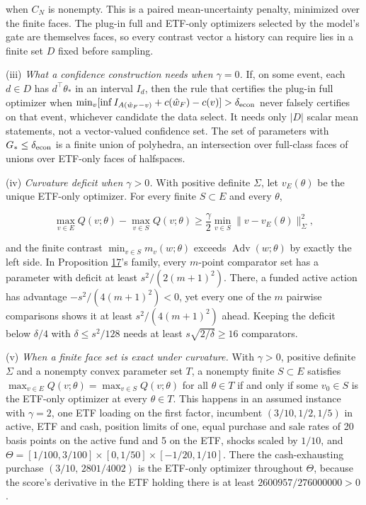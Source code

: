 \documentclass[11pt]{article}
\begin{document}
when \(C_N\) is nonempty. This is a paired mean-uncertainty penalty,
minimized over the finite faces. The plug-in full and ETF-only
optimizers selected by the model's gate are themselves faces, so every
contrast vector a history can require lies in a finite set \(D\) fixed
before sampling.

(iii) \emph{What a confidence construction needs when \(\gamma=0\).} If,
on some event, each \(d\in D\) has \(d^\top\theta_*\) in an interval
\(I_d\), then the rule that certifies the plug-in full optimizer when
\(\min_v[\inf I_{A(\hat w_F-v)}+c(\hat w_F)-c(v)]>\delta_{\rm econ}\)
never falsely certifies on that event, whichever candidate the data
select. It needs only \(|D|\) scalar mean statements, not a
vector-valued confidence set. The set of parameters with
\(G_*\leq\delta_{\rm econ}\) is a finite union of polyhedra, an
intersection over full-class faces of unions over ETF-only faces of
halfspaces.

(iv) \emph{Curvature deficit when \(\gamma>0\).} With positive definite
\(\Sigma\), let \(v_E(\theta)\) be the unique ETF-only optimizer.
For every finite \(S\subset E\) and every \(\theta\),

\begin{equation*}
\max_{v\in E}Q(v;\theta)-\max_{v\in S}Q(v;\theta)
 \geq\frac\gamma2\min_{v\in S}\|v-v_E(\theta)\|_\Sigma^2,\tag{74}\label{eq:74}
\end{equation*}

and the finite contrast \(\min_{v\in S}m_v(w;\theta)\) exceeds
\(\operatorname{Adv}(w;\theta)\) by exactly the left side. In
Proposition \hyperref[res:Proposition-17]{17}'s family, every \(m\)-point comparator set has a
parameter with deficit at least \(s^2/(2(m+1)^2)\). There, a funded
active action has advantage \(-s^2/(4(m+1)^2)<0\), yet every one of
the \(m\) pairwise comparisons shows it at least
\(s^2/(4(m+1)^2)\) ahead. Keeping the deficit below \(\delta/4\) with
\(\delta\leq s^2/128\) needs at least \(s\sqrt{2/\delta}\geq16\)
comparators.

(v) \emph{When a finite face set is exact under curvature.} With
\(\gamma>0\), positive definite \(\Sigma\) and a nonempty convex
parameter set \(T\), a nonempty finite \(S\subset E\) satisfies
\(\max_{v\in E}Q(v;\theta)=\max_{v\in S}Q(v;\theta)\) for all
\(\theta\in T\) if and only if some \(v_0\in S\) is the ETF-only
optimizer at every \(\theta\in T\). This happens in an assumed instance with
\(\gamma=2\), one ETF loading on the first factor, incumbent
\((3/10,1/2,1/5)\) in active, ETF and cash, position limits of one,
equal purchase and sale rates of 20 basis points on the active fund
and 5 on the ETF, shocks scaled by \(1/10\), and
\(\Theta=[1/100,3/100]\times[0,1/50]\times[-1/20,1/10]\). There the
cash-exhausting purchase \((3/10,\,2801/4002)\) is the ETF-only
optimizer throughout \(\Theta\), because the score's derivative in the
ETF holding there is at least \(2600957/276000000>0\).
\end{document}
